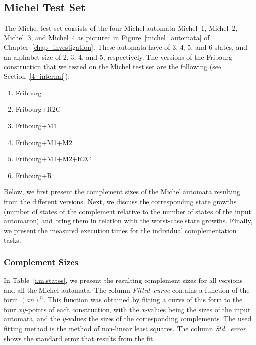 


\subsection{Michel Test Set}
\label{5_internal_michel}
The Michel test set consists of the four Michel automata Michel~1, Michel~2, Michel~3, and Michel~4 as pictured in Figure~\ref{michel_automata} of Chapter~\ref{chap_investigation}. These automata have of 3, 4, 5, and 6 states, and an alphabet size of 2, 3, 4, and 5, respectively. The versions of the Fribourg construction that we tested on the Michel test set are the following (see Section~\ref{4_internal}):

\begin{enumerate}
\item Fribourg
\item Fribourg+R2C
\item Fribourg+M1
\item Fribourg+M1+M2
\item Fribourg+M1+M2+R2C
\item Fribourg+R
\end{enumerate}

Below, we first present the complement sizes of the Michel automata resulting from the different versions. Next, we discuss the corresponding state growths (number of states of the complement relative to the number of states of the input automaton) and bring them in relation with the worst-case state growths. Finally, we present the measured execution times for the individual complementation tasks. 

\subsubsection{Complement Sizes}
In Table~\ref{i.m.states}, we present the resulting complement sizes for all versions and all the Michel automata. The column \textit{Fitted~curve} contains a function of the form $(an)^n$. This function was obtained by fitting a curve of this form to the four $xy$-points of each construction, with the $x$-values being the sizes of the input automata, and the $y$-values the sizes of the corresponding complements. The used fitting method is the method of non-linear least squares. The column \textit{Std.~error} shows the standard error that results from the fit.

